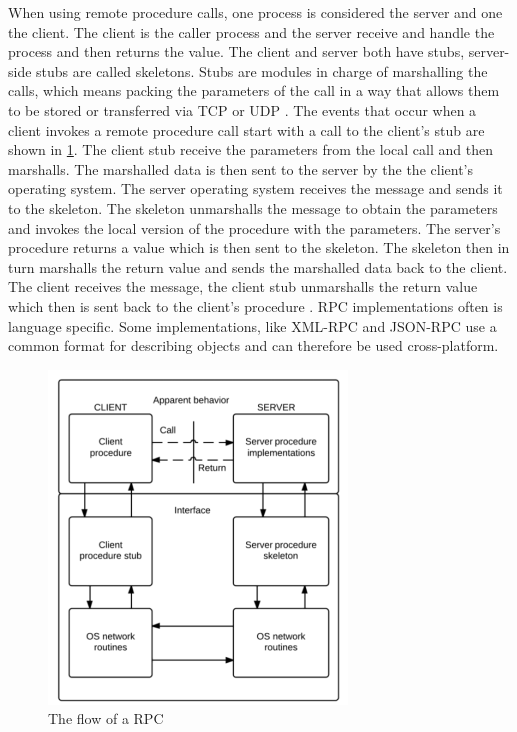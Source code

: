 When using remote procedure calls, one process is considered the server and one the client. The client is the caller process and the server receive and handle the process and then returns the value. The client and server both have stubs, server-side stubs are called skeletons. Stubs are modules in charge of marshalling the calls, which means packing the parameters of the call in a way that allows them to be stored or transferred via TCP or UDP \cite{rfc5531}. 
The events that occur when a client invokes a remote procedure call start with a call to the client's stub are shown in \ref{rpcflow}. The client stub receive the parameters from the local call and then marshalls. The marshalled data is then sent to the server by the the client's operating system. The server operating system receives the message and sends it to the skeleton. The skeleton unmarshalls the message  to obtain the parameters and invokes the local version of the procedure with the parameters. The server's procedure returns a value which is then sent to the skeleton. The skeleton then in turn marshalls the return value and sends the marshalled data back to the client. The client receives the message, the client stub unmarshalls the return value which then is sent back to the client's procedure \cite{Lewandowski97interprocesscommunication}. RPC implementations often is language specific. Some implementations, like XML-RPC and 
JSON-RPC use a common format for describing objects and can therefore be used cross-platform.

\begin{figure}[H]
		\centering	\includegraphics{part_2/remote_procedure_calls/Rpcflow300.png}
		\caption{The flow of a RPC}
		\label{rpcflow} 
\end{figure}

